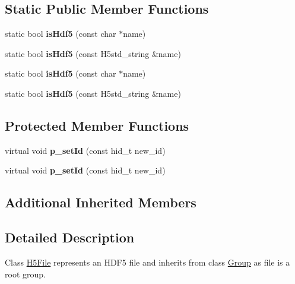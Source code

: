 \subsection*{Static Public Member Functions}
\begin{DoxyCompactItemize}
\item 
\mbox{\label{class_h5_1_1_h5_file_ad7641f497800c999af018117aefc44b2}} 
static bool {\bfseries is\+Hdf5} (const char $\ast$name)
\item 
\mbox{\label{class_h5_1_1_h5_file_a99d5a59eb880b5beaab0be75218d0378}} 
static bool {\bfseries is\+Hdf5} (const H5std\+\_\+string \&name)
\item 
\mbox{\label{class_h5_1_1_h5_file_ad7641f497800c999af018117aefc44b2}} 
static bool {\bfseries is\+Hdf5} (const char $\ast$name)
\item 
\mbox{\label{class_h5_1_1_h5_file_a99d5a59eb880b5beaab0be75218d0378}} 
static bool {\bfseries is\+Hdf5} (const H5std\+\_\+string \&name)
\end{DoxyCompactItemize}
\subsection*{Protected Member Functions}
\begin{DoxyCompactItemize}
\item 
\mbox{\label{class_h5_1_1_h5_file_abfc71d24e32bb50e076c9af6f344612b}} 
virtual void {\bfseries p\+\_\+set\+Id} (const hid\+\_\+t new\+\_\+id)
\item 
\mbox{\label{class_h5_1_1_h5_file_abfc71d24e32bb50e076c9af6f344612b}} 
virtual void {\bfseries p\+\_\+set\+Id} (const hid\+\_\+t new\+\_\+id)
\end{DoxyCompactItemize}
\subsection*{Additional Inherited Members}


\subsection{Detailed Description}
Class \hyperlink{class_h5_1_1_h5_file}{H5\+File} represents an H\+D\+F5 file and inherits from class \hyperlink{class_h5_1_1_group}{Group} as file is a root group. 

